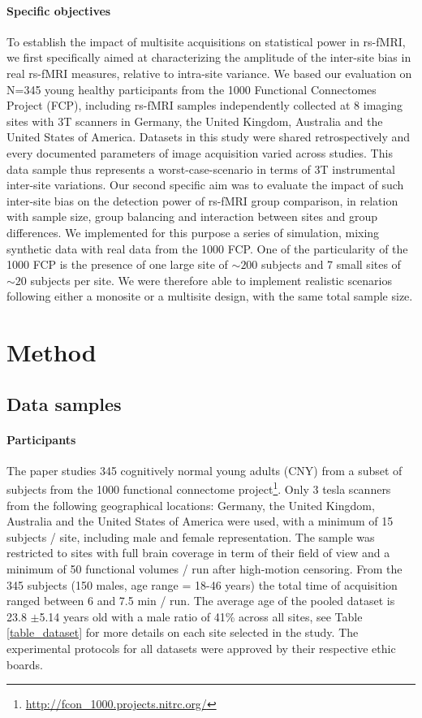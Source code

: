 \documentclass[authoryear]{elsarticle}
\begin{document}
\paragraph{Specific objectives}
To establish the impact of multisite acquisitions on statistical power in rs-fMRI, we first specifically aimed at characterizing the amplitude of the inter-site bias in real rs-fMRI measures, relative to intra-site variance. We based our evaluation on N=345 young healthy participants from the 1000 Functional Connectomes Project (FCP), including rs-fMRI samples independently collected at 8 imaging sites with 3T scanners in Germany, the United Kingdom, Australia and the United States of America. Datasets in this study were shared retrospectively and every documented parameters of image acquisition varied across studies. This data sample thus represents a worst-case-scenario in terms of 3T instrumental inter-site variations. Our second specific aim was to evaluate the impact of such inter-site bias on the detection power of rs-fMRI group comparison, in relation with sample size, group balancing and interaction between sites and group differences. We implemented for this purpose a series of simulation, mixing synthetic data with real data from the 1000 FCP. One of the particularity of the 1000 FCP is the presence of one large site of $\sim200$ subjects and 7 small sites of $\sim20$ subjects per site. We were therefore able to implement realistic scenarios following either a monosite or a multisite design, with the same total sample size.

\section{Method}


\subsection{Data samples}

\paragraph{Participants}
The paper studies 345 cognitively normal young adults (CNY) from a subset of subjects from the 1000 functional connectome project\footnote{\url{http://fcon_1000.projects.nitrc.org/}}. Only 3 tesla scanners from the following geographical locations: Germany, the United Kingdom, Australia and the United States of America were used, with a minimum of 15 subjects / site, including male and female representation. The sample was restricted to sites with full brain coverage in term of their field of view and a minimum of 50 functional volumes / run after high-motion censoring. From the 345 subjects (150 males, age range = 18-46 years) the total time of acquisition ranged between 6 and 7.5 min / run. The average age of the pooled dataset is 23.8 $\pm$5.14 years old with a male ratio of 41\% across all sites, see Table \ref{table_dataset} for more details on each site selected in the study. The experimental protocols for all datasets were approved by their respective ethic boards.  
\end{document}
